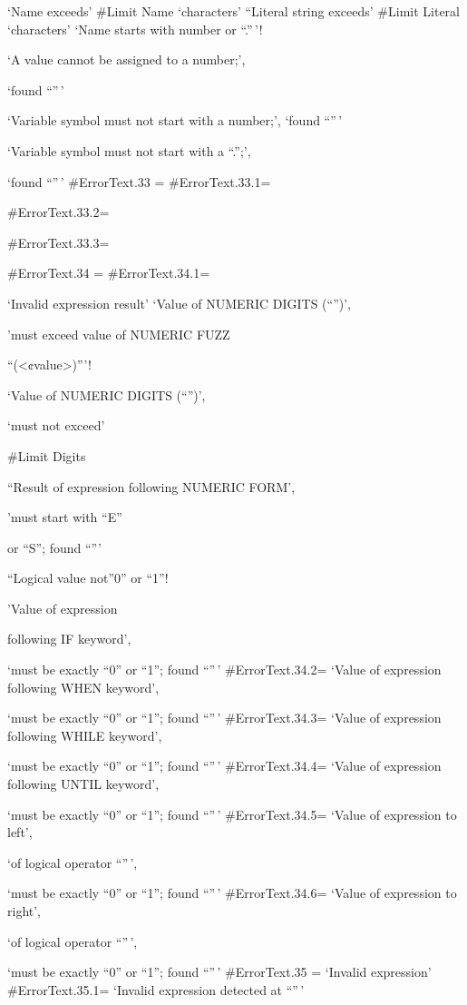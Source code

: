 `Name exceeds' \#Limit Name `characters' ``Literal string exceeds'
\#Limit Literal `characters' `Name starts with number or ``.''\,'!

`A value cannot be assigned to a number;',

`found ``''\,'

`Variable symbol must not start with a number;', `found ``''\,'

`Variable symbol must not start with a ``.'';',

`found ``''\,' \#ErrorText.33 = \#ErrorText.33.1=

\#ErrorText.33.2=

\#ErrorText.33.3=

\#ErrorText.34 = \#ErrorText.34.1=

`Invalid expression result' `Value of NUMERIC DIGITS (``'')',

'must exceed value of NUMERIC FUZZ

``(\textless¢value\textgreater)'''!

`Value of NUMERIC DIGITS (``'')',

`must not exceed'

\#Limit Digits

``Result of expression following NUMERIC FORM',

'must start with ``E''

or ``S''; found ``'''

``Logical value not''0'' or ``1''!

'Value of expression

following IF keyword',

`must be exactly ``0'' or ``1''; found ``''\,' \#ErrorText.34.2= `Value
of expression following WHEN keyword',

`must be exactly ``0'' or ``1''; found ``''\,' \#ErrorText.34.3= `Value
of expression following WHILE keyword',

`must be exactly ``0'' or ``1''; found ``''\,' \#ErrorText.34.4= `Value
of expression following UNTIL keyword',

`must be exactly ``0'' or ``1''; found ``''\,' \#ErrorText.34.5= `Value
of expression to left',

`of logical operator ``''\,',

`must be exactly ``0'' or ``1''; found ``''\,' \#ErrorText.34.6= `Value
of expression to right',

`of logical operator ``''\,',

`must be exactly ``0'' or ``1''; found ``''\,' \#ErrorText.35 = `Invalid
expression' \#ErrorText.35.1= `Invalid expression detected at ``''\,'

